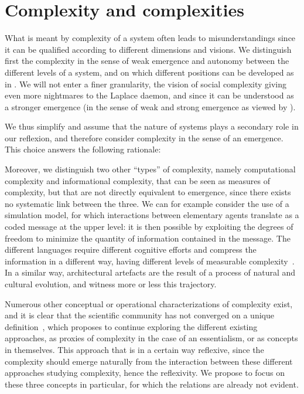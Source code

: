 \section{Complexity and complexities}


What is meant by complexity of a system often leads to misunderstandings since it can be qualified according to different dimensions and visions. We distinguish first the complexity in the sense of weak emergence and autonomy between the different levels of a system, and on which different positions can be developed as in \cite{deffuant2015visions}. We will not enter a finer granularity, the vision of social complexity giving even more nightmares to the Laplace daemon, and since it can be understood as a stronger emergence (in the sense of weak and strong emergence as viewed by \cite{bedau2002downward}).

We thus simplify and assume that the nature of systems plays a secondary role in our reflexion, and therefore consider complexity in the sense of an emergence. This choice answers the following rationale: %


Moreover, we distinguish two other ``types'' of complexity, namely computational complexity and informational complexity, that can be seen as measures of complexity, but that are not directly equivalent to emergence, since there exists no systematic link between the three. We can for example consider the use of a simulation model, for which interactions between elementary agents translate as a coded message at the upper level: it is then possible by exploiting the degrees of freedom to minimize the quantity of information contained in the message. The different languages require different cognitive efforts and compress the information in a different way, having different levels of measurable complexity~\cite{febres2013complexity}. In a similar way, architectural artefacts are the result of a process of natural and cultural evolution, and witness more or less this trajectory.


Numerous other conceptual or operational characterizations of complexity exist, and it is clear that the scientific community has not converged on a unique definition~\cite{chu2008criteria}, which proposes to continue exploring the different existing approaches, as proxies of complexity in the case of an essentialism, or as concepts in themselves. This approach that is in a certain way reflexive, since the complexity should emerge naturally from the interaction between these different approaches studying complexity, hence the reflexivity. We propose to focus on these three concepts in particular, for which the relations are already not evident.



